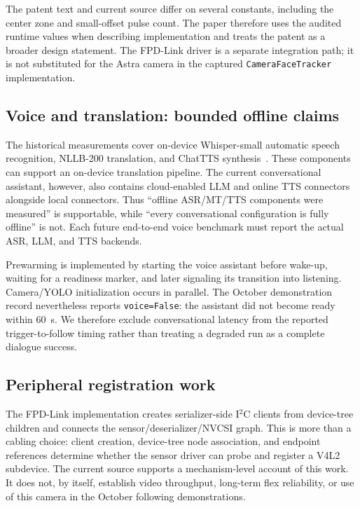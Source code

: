 \documentclass[conference]{IEEEtran}
\newcommand{\code}[1]{\texttt{#1}}
\begin{document}
The patent text and current source differ on several constants, including the center zone and small-offset pulse count. The paper therefore uses the audited runtime values when describing implementation and treats the patent as a broader design statement. The FPD-Link driver is a separate integration path; it is not substituted for the Astra camera in the captured \code{CameraFaceTracker} implementation.

\subsection{Voice and translation: bounded offline claims}
The historical measurements cover on-device Whisper-small automatic speech recognition, NLLB-200 translation, and ChatTTS synthesis~\cite{radford2022whisper,nllb2022,chattts2024}. These components can support an on-device translation pipeline. The current conversational assistant, however, also contains cloud-enabled LLM and online TTS connectors alongside local connectors. Thus ``offline ASR/MT/TTS components were measured'' is supportable, while ``every conversational configuration is fully offline'' is not. Each future end-to-end voice benchmark must report the actual ASR, LLM, and TTS backends.

Prewarming is implemented by starting the voice assistant before wake-up, waiting for a readiness marker, and later signaling its transition into listening. Camera/YOLO initialization occurs in parallel. The October demonstration record nevertheless reports \code{voice=False}: the assistant did not become ready within 60~s. We therefore exclude conversational latency from the reported trigger-to-follow timing rather than treating a degraded run as a complete dialogue success.

\subsection{Peripheral registration work}
The FPD-Link implementation creates serializer-side I$^2$C clients from device-tree children and connects the sensor/deserializer/NVCSI graph. This is more than a cabling choice: client creation, device-tree node association, and endpoint references determine whether the sensor driver can probe and register a V4L2 subdevice. The current source supports a mechanism-level account of this work. It does not, by itself, establish video throughput, long-term flex reliability, or use of this camera in the October following demonstrations.
\end{document}
